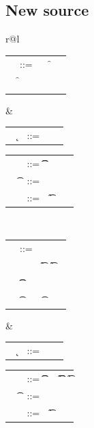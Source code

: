 \documentclass[acmlarge, anonymous, authordraft]{acmart}
\begin{document}
\subsection{New source}
\begin{tabular}{r@{}l}
\begin{minipage}{6cm}\begin{tabular}{@{}l@{~}l@{}l@{}l@{}l}
\e &::=  \x         &\B \this    &\B \sGet\e\f      \\
   &\B \sSet\e\f\e &\B \Call\e\m\e &\B \DynCall\e\m\e  \\
   &\B \New\C{\b\e}  \\ 
   
\end{tabular}\end{minipage} &
\begin{minipage}{5.9cm}\begin{tabular}{l@{~}l@{}l@{}l}
   ~ \k &::= \Class \C {\b\fd}{\b\md}
\end{tabular}
\begin{tabular}{l@{~}l@{}l@{}l}
\md &::= \Mdef\m\x\t\t\e   \\
~ \t&::= ~ \any  \B   \C  \\ 
~\fd&::= ~ \Fdef\f\t \\ 
\end{tabular}\end{minipage} \\
\begin{minipage}{6cm}\begin{tabular}{@{}l@{~}l@{}l@{}l@{}l}
\e &::=  \x         &\B \this         &\B \that      \\
   &\B \New\C{\b\e}  &\B \Get\e\f\t     &\B \Set\e\f\t\e   \\
   &\B \KCall\e\m\e\t\t &\B \DynCall\e\m\e &\B \a \\ 
   &\B \SubCast\t\e &\B \BehCast\t\e 
\end{tabular}\end{minipage} &
\begin{minipage}{5.9cm}\begin{tabular}{l@{~}l@{}l@{}l}
   ~ \k &::= \Class \C {\b\fd}{\b\md}
\end{tabular}
\begin{tabular}{l@{~}l@{}l@{}l}
\md &::= \Mdef\m\x\t\t\e   &\B  \Mdef\f\x\t\t\e &\B \Mdefz\f\t\e \\
~ \t&::= ~ \any  \B   \C  \\ 
~\fd&::= ~ \Fdef\f\t \\ 
\end{tabular}\end{minipage}
\end{tabular}
\end{document}
